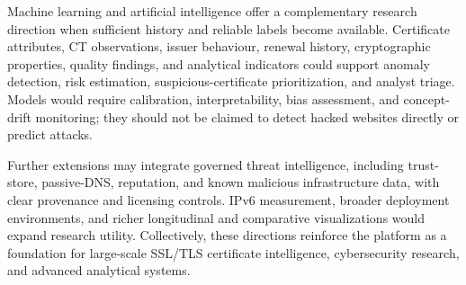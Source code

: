 Machine learning and artificial intelligence offer a complementary research
direction when sufficient history and reliable labels become available.
Certificate attributes, CT observations, issuer behaviour, renewal history,
cryptographic properties, quality findings, and analytical indicators could
support anomaly detection, risk estimation, suspicious-certificate
prioritization, and analyst triage. Models would require calibration,
interpretability, bias assessment, and concept-drift monitoring; they should
not be claimed to detect hacked websites directly or predict attacks.

Further extensions may integrate governed threat intelligence, including
trust-store, passive-DNS, reputation, and known malicious infrastructure data,
with clear provenance and licensing controls. IPv6
measurement, broader deployment environments, and richer longitudinal and
comparative visualizations would expand research utility. Collectively, these
directions reinforce the platform as a foundation for large-scale SSL/TLS
certificate intelligence, cybersecurity research, and advanced analytical
systems.
